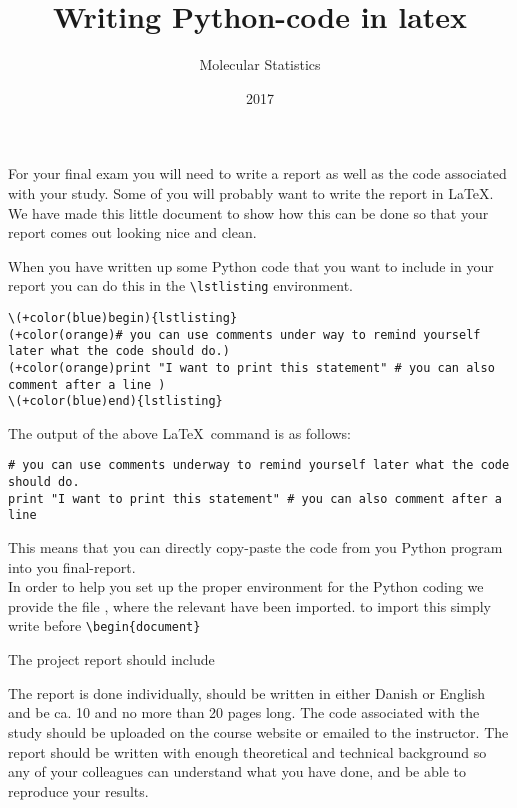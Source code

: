 \documentclass{article}
\title{Writing Python-code in latex}
\author{Molecular Statistics}
\date{2017}
\begin{document}
\maketitle\thispagestyle{fancy}


For your final exam you will need to write a report as well as the code associated with your study. 
Some of you will probably want to write the report in \LaTeX. 
We have made this little document to show how this can be done so that your report comes out looking nice and clean.

When you have written up some Python code that you want to include in your report you can do this in the \verb+\lstlisting+ environment.

\begin{Verbatim}[commandchars=+\(\)]
\(+color(blue)begin){lstlisting}
(+color(orange)# you can use comments under way to remind yourself later what the code should do.)
(+color(orange)print "I want to print this statement" # you can also comment after a line )
\(+color(blue)end){lstlisting}
\end{Verbatim}

The output of the above \LaTeX \ command is as follows:

\begin{lstlisting}
# you can use comments underway to remind yourself later what the code should do.
print "I want to print this statement" # you can also comment after a line
\end{lstlisting}

This means that you can directly copy-paste the code from you Python program into you final-report.\\

In order to help you set up the proper environment for the Python coding we provide the file , where the relevant  have been imported. to import this simply write \verb++ before \verb+\begin{document}+\\

\begin{center}\large{The project report should include}\end{center}

The report is done individually, should be written in either Danish or English and be ca. 10
and no more than 20 pages long. The code associated with the study should be uploaded on the course
website or emailed to the instructor.
The report should be written with enough theoretical and technical background so any of your colleagues
can understand what you have done, and be able to reproduce your results.
\end{document}
